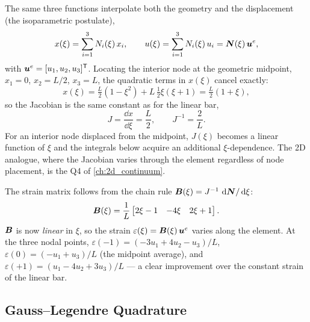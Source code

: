 The same three functions interpolate both the geometry and the
displacement (the isoparametric postulate),
\begin{equation}
    x(\xi) = \sum_{i=1}^{3} N_i(\xi)\,x_i ,
    \qquad
    u(\xi) = \sum_{i=1}^{3} N_i(\xi)\,u_i = \bm{N}(\xi)\,\bm{u}^e ,
    \label{eq:bar_iso_quad}
\end{equation}
with $\bm{u}^e = [u_1,u_2,u_3]^{\mathsf{T}}$. Locating the interior node
at the geometric midpoint, $x_1 = 0$, $x_2 = L/2$, $x_3 = L$, the
quadratic terms in $x(\xi)$ cancel exactly:
\begin{equation*}
    x(\xi)
    = \tfrac{L}{2}(1-\xi^2) + L\,\tfrac{1}{2}\xi(\xi+1)
    = \tfrac{L}{2}(1+\xi),
\end{equation*}
so the Jacobian is the same constant as for the linear bar,
\begin{equation}
    J = \frac{\dd x}{\dd\xi} = \frac{L}{2} ,
    \qquad
    J^{-1} = \frac{2}{L} .
    \label{eq:jacobian_quad}
\end{equation}
For an interior node displaced from the midpoint, $J(\xi)$ becomes a
linear function of $\xi$ and the integrals below acquire an additional
$\xi$-dependence. The 2D analogue, where the Jacobian varies through the
element regardless of node placement, is the Q4 of \cref{ch:2d_continuum}.

The strain matrix follows from the chain rule
$\bm{B}(\xi) = J^{-1}\,\,\mathrm{d}\bm{N}/\,\mathrm{d}\xi$:
\begin{equation}
    \bm{B}(\xi) =
    \frac{1}{L}\begin{bmatrix} 2\xi-1 & -4\xi & 2\xi+1 \end{bmatrix} .
    \label{eq:bar_B_quad}
\end{equation}
$\bm{B}$ is now \emph{linear} in $\xi$, so the strain
$\varepsilon(\xi) = \bm{B}(\xi)\,\bm{u}^e$ varies along the element.
At the three nodal points,
$\varepsilon(-1) = (-3 u_1 + 4 u_2 - u_3)/L$,
$\varepsilon( 0) = (-u_1 + u_3)/L$ (the midpoint average), and
$\varepsilon(+1) = (u_1 - 4 u_2 + 3 u_3)/L$ --- a clear improvement over
the constant strain of the linear bar.

\subsection{Gauss--Legendre Quadrature}
\label{sec:gauss_legendre}

